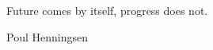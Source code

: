 \vspace*{0.8\textheight}
\setlength{\epigraphwidth}{7cm}
\renewcommand{\textflush}{flushright}
\epigraph{Future comes by itself, progress does not.}
            {Poul Henningsen}